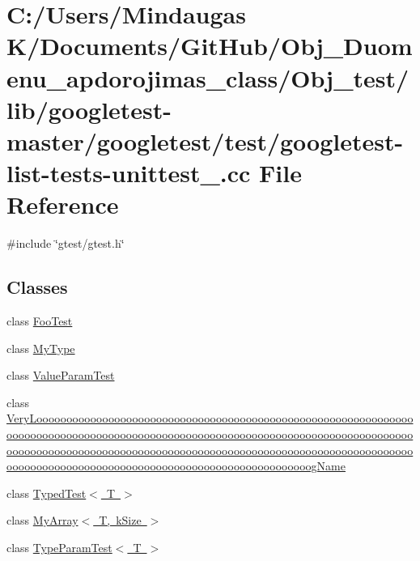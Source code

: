 \hypertarget{_obj__test_2lib_2googletest-master_2googletest_2test_2googletest-list-tests-unittest___8cc}{}\section{C\+:/\+Users/\+Mindaugas K/\+Documents/\+Git\+Hub/\+Obj\+\_\+\+Duomenu\+\_\+apdorojimas\+\_\+class/\+Obj\+\_\+test/lib/googletest-\/master/googletest/test/googletest-\/list-\/tests-\/unittest\+\_\+.cc File Reference}
\label{_obj__test_2lib_2googletest-master_2googletest_2test_2googletest-list-tests-unittest___8cc}
{\ttfamily \#include \char`\"{}gtest/gtest.\+h\char`\"{}}\newline
\subsection*{Classes}
\begin{DoxyCompactItemize}
\item 
class \mbox{\hyperlink{class_foo_test}{Foo\+Test}}
\item 
class \mbox{\hyperlink{class_my_type}{My\+Type}}
\item 
class \mbox{\hyperlink{class_value_param_test}{Value\+Param\+Test}}
\item 
class \mbox{\hyperlink{class_very_loooooooooooooooooooooooooooooooooooooooooooooooooooooooooooooooooooooooooooooooooooo570db76e21fa868abfe0f6323a68c9ba}{Very\+Loooooooooooooooooooooooooooooooooooooooooooooooooooooooooooooooooooooooooooooooooooooooooooooooooooooooooooooooooooooooooooooooooooooooooooooooooooooooooooooooooooooooooooooooooooooooooooooooooooooooooooooooooooooooooooooooooooooooooooooooooooooooooog\+Name}}
\item 
class \mbox{\hyperlink{class_typed_test}{Typed\+Test$<$ T $>$}}
\item 
class \mbox{\hyperlink{class_my_array}{My\+Array$<$ T, k\+Size $>$}}
\item 
class \mbox{\hyperlink{class_type_param_test}{Type\+Param\+Test$<$ T $>$}}
\end{DoxyCompactItemize}
